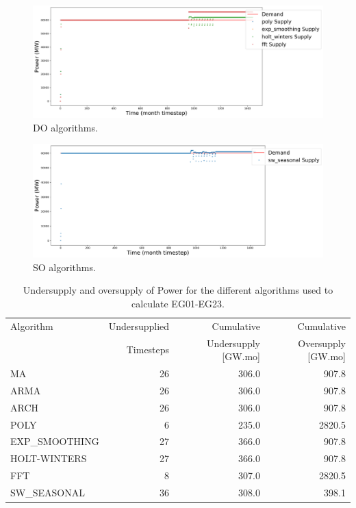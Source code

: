 \documentclass[11pt]{article}
\begin{document}
\begin{figure}[!h]
	\centering
	\includegraphics[width=\textwidth]{23-figures/23-power-buffer02.png} 
	\hfill
	\caption{DO algorithms.}
	\label{fig:23-DO}
\end{figure}

\begin{figure}[!h]
	\centering
	\includegraphics[width=\textwidth]{23-figures/23-power-buffer03.png} 
	\hfill
	\caption{SO algorithms.}
	\label{fig:23-SO}
\end{figure}

\begin{table}[!h]
	\centering
	\caption{Undersupply and oversupply of Power for the different algorithms used to calculate EG01-EG23.}
	\label{tab:23-power}
	\begin{tabularx}{\textwidth}{lRRR}
		\hline
		Algorithm & Undersupplied & Cumulative  & Cumulative \\
		& Timesteps     & Undersupply [GW.mo]  & Oversupply [GW.mo] \\ \hline
		MA        & 26 	& 306.0 &  907.8   \\ 
		ARMA      & 26 	& 306.0 &  907.8   \\ 
		ARCH      & 26 	& 306.0 &  907.8   \\ 
		POLY      &  6 	& 235.0 &  2820.5  \\ 
		EXP\_SMOOTHING 	& 27 & 366.0 & 907.8 \\ 
		HOLT-WINTERS  	& 27 & 366.0 & 907.8 \\ 
		FFT       & 8	& 307.0	& 2820.5 \\ 
		SW\_SEASONAL    & 36 & 308.0 & 398.1	\\ \hline
	\end{tabularx}
\end{table}
\end{document}
